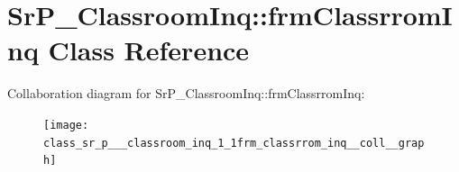 \hypertarget{class_sr_p___classroom_inq_1_1frm_classrrom_inq}{
\section{\-Sr\-P\-\_\-\-Classroom\-Inq\-:\-:frm\-Classrrom\-Inq \-Class \-Reference}
\label{class_sr_p___classroom_inq_1_1frm_classrrom_inq}
}


\-Collaboration diagram for \-Sr\-P\-\_\-\-Classroom\-Inq\-:\-:frm\-Classrrom\-Inq\-:\nopagebreak
\begin{figure}[H]
\begin{center}
\leavevmode
\texttt{[image: class\_sr\_p\_\_\_classroom\_inq\_1\_1frm\_classrrom\_inq\_\_coll\_\_graph]}
\end{center}
\end{figure}
